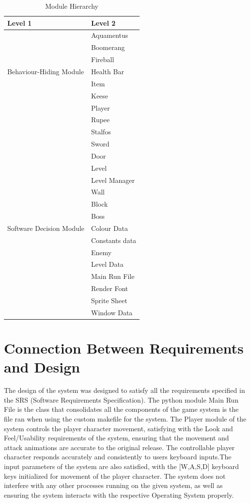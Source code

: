 \documentclass[12pt, titlepage]{article}
\begin{document}
\begin{table}[h!]
\centering
\begin{tabular}{p{} p{}}
\toprule
\textbf{Level 1} & \textbf{Level 2}\\
\midrule

\multirow{7}{0.3\textwidth}{Behaviour-Hiding Module}
& Aquamentus \\
& Boomerang \\
& Fireball \\
& Health Bar \\
& Item \\
& Keese \\
& Player \\
& Rupee \\
& Stalfos \\
& Sword \\
& Door \\
& Level \\
& Level Manager \\
& Wall \\
& Block \\
\midrule

\multirow{3}{0.3\textwidth}{Software Decision Module}
& Boss \\
& Colour Data \\
& Constants data \\
& Enemy \\
& Level Data \\
& Main Run File \\
& Render Font \\
& Sprite Sheet \\
& Window Data \\
\bottomrule

\end{tabular}
\caption{Module Hierarchy}
\label{TblMH}
\end{table}

\section{Connection Between Requirements and Design} \label{SecConnection}
The design of the system was designed to satisfy all the requirements specified in the SRS (Software Requirements Specification). The python module Main Run File is the class that consolidates all the components of the game system is the file ran when using the custom makefile for the system.  The Player module of the system controls the player character movement, satisfying with the Look and Feel/Usability requirements of the system, ensuring that the movement and attack animations are accurate to the original release. The controllable player character responds accurately and consistently to users keyboard inputs.The input parameters of the system are also satisfied, with the [W,A,S,D] keyboard keys initialized for movement of the player character. The system does not interfere with any other processes running on the given system, as well as ensuring the system interacts with the respective Operating System properly.
\end{document}
